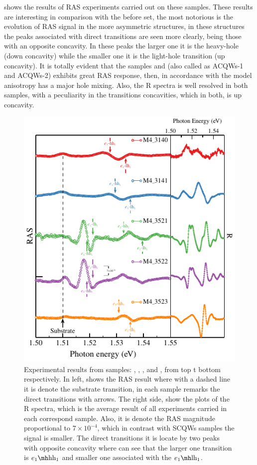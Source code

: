  shows the results of \gls{RAS} experiments carried out on these samples. These results are interesting in comparison with the before set,  the most notorious is the evolution of \gls{RAS} signal in the more asymmetric structures, in these structures the peaks associated with direct transitions are seen more clearly, being those with an opposite concavity. In these peaks the larger one it is the heavy-hole (down concavity) while the  smaller one it is the light-hole transition (up concavity). It is totally evident that the samples  and  (also called as ACQWs-1 and ACQWs-2) exhibits great \gls{RAS} response, then, in  accordance with the model anisotropy  has a major hole mixing.  Also, the \gls{R} spectra is well resolved in both samples, with a peculiarity in the transitions concavities, which in both, is up concavity. 
\begin{figure}
	\centering
	\includegraphics[width=\textwidth]{../figures/chapter-3/ras-plots/build-ruco/ras-set-2.pdf}
	\caption{Experimental results from samples: , , ,  and , from top t bottom respectively. In left, shows the RAS result where with a dashed line it is denote the substrate transition, in each sample remarks the direct transitions with arrows. The right side, show the plots of the R spectra, which is the average result of all experiments carried in each correspond sample. Also, it is denote the \gls{RAS} magnitude proportional to $7\times 10^{-4}$, which in contrast with \gls{SCQWs} samples the signal is smaller. The direct transitions  it is locate by two peaks with opposite concavity where can see that the larger one transition is $\thh{1}{1}$  and  smaller one associated with the $\tlh{1}{1}$.}
	\label{fig:chapter-3-subsec-ras-plots-set-2}
\end{figure}
